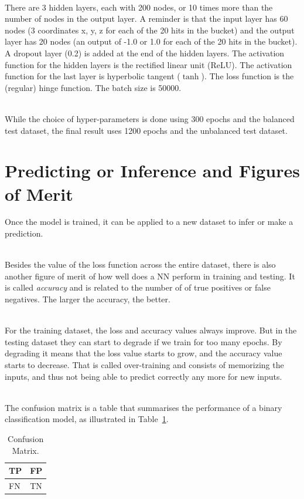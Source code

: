 \ \\There are 3 hidden layers, each with 200 nodes, or 10 times more than the number of nodes in the output layer. A reminder is that the input layer has 60 nodes (3 coordinates x, y, z for each of the 20 hits in the bucket) and the output layer has 20 nodes (an output of -1.0 or 1.0 for each of the 20 hits in the bucket). A dropout layer (0.2) is added at the end of the hidden layers. The activation function for the hidden layers is the rectified linear unit (ReLU). The activation function for the last layer is hyperbolic tangent ($\tanh$). The loss function is the (regular) hinge function. The batch size is 50000.

\ \\While the choice of hyper-parameters is done using 300 epochs and the balanced test dataset, the final result uses 1200 epochs and the unbalanced test dataset.

\section{Predicting or Inference and Figures of Merit}

Once the model is trained, it can be applied to a new dataset to infer or make a prediction.

\ \\Besides the value of the loss function across the entire dataset, there is also another figure of merit of how well does a NN perform in training and testing. It is called \emph{accuracy} and is related to the number of of true positives or false negatives. The larger the accuracy, the better.

\ \\For the training dataset, the loss and accuracy values always improve. But in the testing dataset they can start to degrade if we train for too many epochs. By degrading it means that the loss value starts to grow, and the accuracy value starts to decrease. That is called over-training and consists of memorizing the inputs, and thus not being able to predict correctly any more for new inputs.

\ \\The confusion matrix is a table that summarises the performance of a binary classification model, as illustrated in Table~\ref{tab:ConfusionMatrix}. 

\begin{table}[h!]
 \centering
   
    \begin{tabular}{|l|l|} %
      \hline
      TP & FP \\
      \hline
      FN & TN \\
      \hline
    \end{tabular}
\caption {Confusion Matrix.}
\label{tab:ConfusionMatrix}
\end{table}

